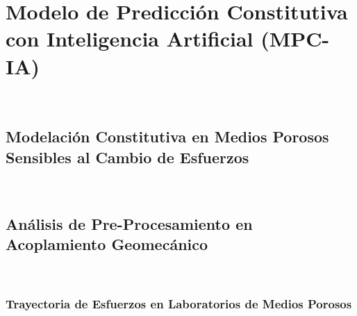 %





\chapter{Modelo de Predicción Constitutiva con Inteligencia Artificial (MPC-IA)}~\hypertarget{ch:chapter_06}{}
\label{ch:chapter_06}

\lipsum[1-2]

\section{Modelación Constitutiva en Medios Porosos Sensibles al Cambio de Esfuerzos}~\hypertarget{sec:sec610}{}
\label{sec:sec610}


\section{Análisis de Pre-Procesamiento en Acoplamiento Geomecánico}~\hypertarget{sec:sec620}{}
\label{sec:sec620}


\subsection{Trayectoria de Esfuerzos en Laboratorios de Medios Porosos}~\hypertarget{sec:sec621}{}
\label{sec:sec621}


